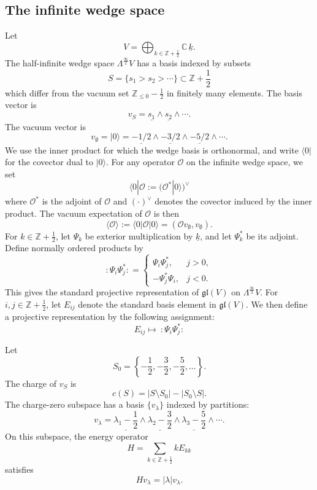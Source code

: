 \documentclass[letterpaper,12pt]{amsart}
\theoremstyle{definition}
\newcommand{\C}{\mathbb C}
\newcommand{\Z}{\mathbb Z}
\numberwithin{equation}{section}
\begin{document}
\subsection{The infinite wedge space}
Let
\[
  V=\bigoplus_{k\in\Z+\frac{1}{2}}\C\,\underline{k}.
\]
The half-infinite wedge space \(\Lambda^{\frac{\infty}{2}}V\) has a basis indexed by subsets
\[
  S=\{s_1>s_2>\cdots\}\subset \Z+\frac{1}{2}
\]
which differ from the vacuum set \(\Z_{\le0}-\frac{1}{2}\) in finitely many elements.  The basis vector is
\[
  v_S=\underline{s_1}\wedge \underline{s_2}\wedge\cdots.
\]
The vacuum vector is
\[
 v_\emptyset= |0\rangle
  =\underline{-1/2}\wedge\underline{-3/2}\wedge\underline{-5/2}\wedge\cdots.
\]
We use the inner product for which the wedge basis is orthonormal, and write
\(\langle0|\) for the covector dual to \(|0\rangle\).  For any operator \(\mathcal O\) on the infinite wedge space, we set
\[
  \langle 0|\mathcal O
  :=\bigl(\mathcal O^*|0\rangle\bigr)^\vee
\]
where \(\mathcal O^*\) is the adjoint of \(\mathcal O\) and \((\cdot)^\vee\) denotes the covector induced by the inner product.
The vacuum expectation of \(\mathcal O\) is then
\[
  \langle\mathcal O\rangle
  :=\langle0|\mathcal O|0\rangle
  =(\mathcal Ov_{\emptyset},v_{\emptyset}).
\]
For \(k\in\Z+\frac{1}{2}\), let \(\Psi_k\) be exterior multiplication by \(\underline{k}\), and let \(\Psi_k^*\) be its adjoint.  Define normally ordered products by
\[
 :\Psi_i\Psi_j^*:
 =
 \begin{cases}
 \Psi_i\Psi_j^*,&j>0,\\
 -\Psi_j^*\Psi_i,&j<0.
 \end{cases}
\]
This gives the standard projective representation of \(\mathfrak{gl}(V)\) on \(\Lambda^{\frac{\infty}{2}}V\).  
For $i,j\in \mathbb{Z}+\frac{1}{2}$, let $E_{ij}$ denote the standard basis element in $\mathfrak{gl}(V)$. We then define a projective representation by the following assignment:
\begin{equation*}
    E_{ij} \mapsto \ :\Psi_i \Psi_j^*:
\end{equation*}


Let
\[
  S_0=\left\{-\frac12,-\frac32,-\frac52,\ldots\right\}.
\]
The charge of \(v_S\) is
\[
  c(S)=|S\setminus S_0|-|S_0\setminus S|.
\]
The charge-zero subspace has a basis \(\{v_\lambda\}\) indexed by partitions:
\[
  v_\lambda
  =
  \underline{\lambda_1-\frac12}
  \wedge\underline{\lambda_2-\frac32}
  \wedge\underline{\lambda_3-\frac52}\wedge\cdots.
\]
On this subspace, the energy operator
\[
  H=\sum_{k\in\Z+\frac12}kE_{kk}
\]
satisfies
\[
  Hv_\lambda=|\lambda|v_\lambda.
\]
\end{document}
